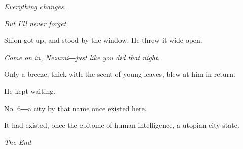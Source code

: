 \emph{Everything changes.}

\emph{But I'll never forget.}

Shion got up, and stood by the window. He threw it wide open.

\emph{Come on in, Nezumi―just like you did that night.}

Only a breeze, thick with the scent of young leaves, blew at him in
return.

He kept waiting.

\myspace

No. 6―a city by that name once existed here.

It had existed, once the epitome of human intelligence, a utopian
city-state.

\myspace

\begin{center}
	\sffamily
	\emph{The End}
\end{center}